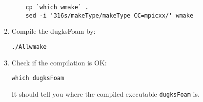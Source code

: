 \begin{enumerate}
\begin{verbatim}
    cp `which wmake` .
    sed -i '316s/makeType/makeType CC=mpicxx/' wmake
\end{verbatim}

%

\item Compile the dugksFoam by:
\begin{verbatim}
./Allwmake
\end{verbatim}

\item Check if the compilation is OK:
\begin{verbatim}
which dugksFoam
\end{verbatim}
It should tell you where the compiled executable \verb|dugksFoam| is.
\end{enumerate}
%

